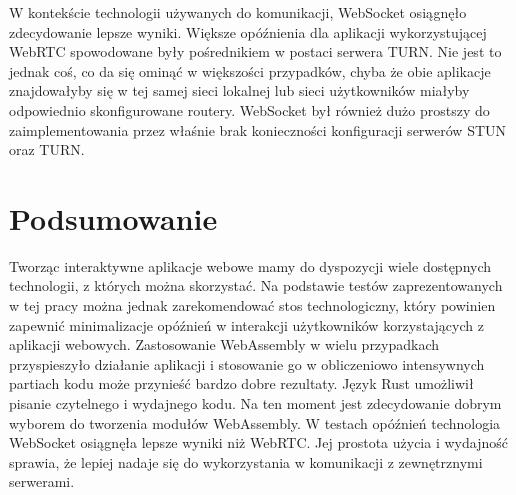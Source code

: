 \documentclass[language=polish,type=master]{aghmodern}
\begin{document}
W kontekście technologii używanych do komunikacji, WebSocket osiągnęło zdecydowanie lepsze wyniki.
Większe opóźnienia dla aplikacji wykorzystującej WebRTC spowodowane były pośrednikiem w postaci serwera TURN.
Nie jest to jednak coś, co da się ominąć w większości przypadków, chyba że obie aplikacje znajdowałyby się w tej samej sieci lokalnej lub sieci użytkowników miałyby odpowiednio skonfigurowane routery.
WebSocket był również dużo prostszy do zaimplementowania przez właśnie brak konieczności konfiguracji serwerów STUN oraz TURN.

\section{Podsumowanie}
Tworząc interaktywne aplikacje webowe mamy do dyspozycji wiele dostępnych technologii, z których można skorzystać.
Na podstawie testów zaprezentowanych w tej pracy można jednak zarekomendować stos technologiczny, który powinien zapewnić minimalizacje opóźnień w interakcji użytkowników korzystających z aplikacji webowych.
Zastosowanie WebAssembly w wielu przypadkach przyspieszyło działanie aplikacji i stosowanie go w obliczeniowo intensywnych partiach kodu może przynieść bardzo dobre rezultaty.
Język Rust umożliwił pisanie czytelnego i wydajnego kodu.
Na ten moment jest zdecydowanie dobrym wyborem do tworzenia modułów WebAssembly.
W testach opóźnień technologia WebSocket osiągnęła lepsze wyniki niż WebRTC.
Jej prostota użycia i wydajność sprawia, że lepiej nadaje się do wykorzystania w komunikacji z zewnętrznymi serwerami.

\backmatter

\cleardoublepage
\renewcommand\listoflistingscaption{Spis listingów}
\listoflistings

\cleardoublepage
\listoffigures

\cleardoublepage
\printbibliography
\end{document}
